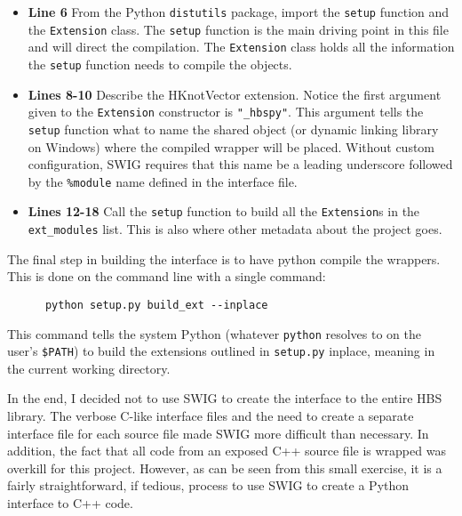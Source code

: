     \begin{itemize}
      \item \textbf{Line 6} From the Python  \texttt{distutils} package, import the \texttt{setup} function and the \texttt{Extension} class. The \texttt{setup} function is the main driving point in this file and will direct the compilation. The \texttt{Extension} class holds all the information the \texttt{setup} function needs to compile the objects.
      \item \textbf{Lines 8-10} Describe the HKnotVector extension. Notice the first argument given to the \texttt{Extension} constructor is \texttt{"\_hbspy"}. This argument tells the \texttt{setup} function what to name the shared object (or dynamic linking library on Windows) where the compiled wrapper will be placed. Without custom configuration, SWIG requires that this name be a leading underscore followed by the \texttt{\%module} name defined in the interface file.
      \item \textbf{Lines 12-18} Call the \texttt{setup} function to build all the \texttt{Extension}s in the \texttt{ext\_modules} list. This is also where other metadata about the project goes.
    \end{itemize}
    \mainstretch{}

    \noindent The final step in building the interface is to have python compile the wrappers. This is done on the command line with a single command:

    \vspace{.2in}
    \begin{lstlisting}
      python setup.py build_ext --inplace
    \end{lstlisting}
    \mainstretch{}

    \noindent This command tells the system Python (whatever \texttt{python} resolves to on the user's \texttt{\$PATH}) to build the extensions outlined in \texttt{setup.py} inplace, meaning in the current working directory.

    In the end, I decided not to use SWIG to create the interface to the entire HBS library. The verbose C-like interface files and the need to create a separate interface file for each source file made SWIG more difficult than necessary. In addition, the fact that all code from an exposed C++ source file is wrapped was overkill for this project. However, as can be seen from this small exercise, it is a fairly straightforward, if tedious, process to use SWIG to create a Python interface to C++ code.

